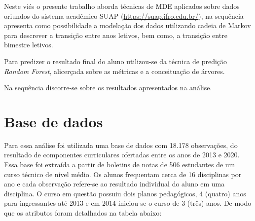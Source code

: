 \documentclass{article}
\begin{document}
Neste viés o presente trabalho aborda técnicas de MDE aplicados sobre dados oriundos do sistema acadêmico SUAP (\url{https://suap.ifro.edu.br/}), na sequência apresenta como possibilidade a modelação dos dados utilizando cadeia de Markov para descrever a transição entre anos letivos, bem como, a transição entre bimestre letivos.

Para predizer o resultado final do aluno utilizou-se da técnica de predição \textit{Random Forest}, alicerçada sobre as métricas e a conceituação de árvores.

Na sequência discorre-se sobre os resultados apresentados na análise.

\section{Base de dados}\label{base_de_dados}

Para essa análise foi utilizada uma base de dados com 18.178 observações, do resultado de componentes curriculares ofertadas entre os anos de 2013 e 2020. Essa base foi extraída a partir de boletins de notas de 506 estudantes de um curso técnico de nível médio. Os alunos frequentam cerca de 16 disciplinas por ano e cada observação refere-se ao resultado individual do aluno em uma disciplina. O curso em questão possuiu dois planos pedagógicos, 4 (quatro) anos para ingressantes até 2013 e em 2014 iniciou-se o curso de 3 (três) anos. De modo que os atributos foram detalhados na tabela abaixo: \\
\end{document}
